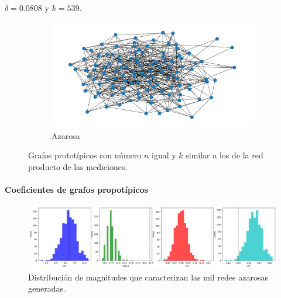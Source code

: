 \documentclass{article}
\begin{document}
$\delta = 0.0808$ y $k = 539$.



\begin{figure}[ht]
	\centering
	\begin{subfigure}[b]{0.32\textwidth}
		\includegraphics[width= \linewidth]{erdos_renyi}
		\caption{Azarosa}
		\label{fg:erdos_renyi}
	\end{subfigure}
	\caption{Grafos prototípicos con número $n$ igual y $k$ similar a los de la red producto de las mediciones. 
	}
	\label{fg:prototípicas}
\end{figure}




\paragraph{Coeficientes de grafos propotípicos}

\begin{figure}[ht]
  \centering
  \includegraphics[width= \linewidth]{hist_poisson}
  \caption{Distribución de magnitudes que caracterizan las mil redes azarosas generadas.}
	\label{fg:hist_poisson}
\end{figure}




\printbibliography[title= Referencias, heading=bibintoc]
\end{document}
